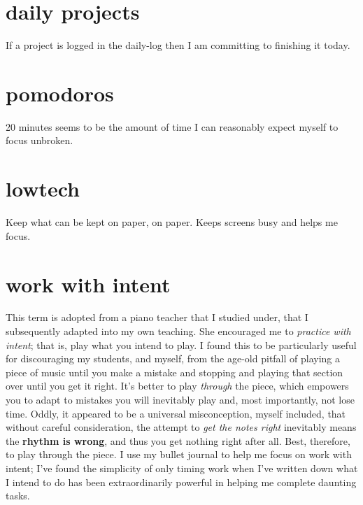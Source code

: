 \documentclass[]{book}
\begin{document}
\hypertarget{daily-projects}{%
\section{daily projects}\label{daily-projects}}

If a project is logged in the \protect\hypertarget{daily-log}{}{daily-log} then I am committing to finishing it today.

\hypertarget{pomodoros}{%
\section{pomodoros}\label{pomodoros}}

20 minutes seems to be the amount of time I can reasonably expect myself to focus unbroken.

\hypertarget{lowtech}{%
\section{lowtech}\label{lowtech}}

Keep what can be kept on paper, on paper. Keeps screens busy and helps me focus.

\hypertarget{work-with-intent}{%
\section{work with intent}\label{work-with-intent}}

This term is adopted from a piano teacher that I studied under, that I subsequently adapted into my own teaching. She encouraged me to \emph{practice with intent}; that is, play what you intend to play. I found this to be particularly useful for discouraging my students, and myself, from the age-old pitfall of playing a piece of music until you make a mistake and stopping and playing that section over until you get it right. It's better to play \emph{through} the piece, which empowers you to adapt to mistakes you will inevitably play and, most importantly, not lose time. Oddly, it appeared to be a universal misconception, myself included, that without careful consideration, the attempt to \emph{get the notes right} inevitably means the \textbf{rhythm is wrong}, and thus you get nothing right after all. Best, therefore, to play through the piece. I use my bullet journal to help me focus on work with intent; I've found the simplicity of only timing work when I've written down what I intend to do has been extraordinarily powerful in helping me complete daunting tasks.
\end{document}

